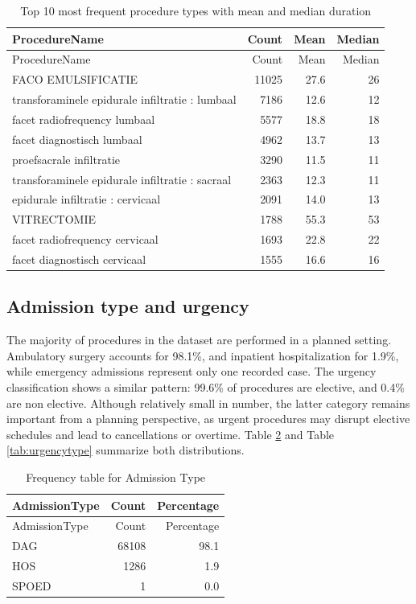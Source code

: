 \documentclass[
]{article}
\begin{document}
\begin{longtable}[]{@{}lrrr@{}}
\caption{Top 10 most frequent procedure types with mean and median
duration \label{tab:top10dur}}\tabularnewline
\toprule\noalign{}
ProcedureName & Count & Mean & Median \\
\midrule\noalign{}
\endfirsthead
\toprule\noalign{}
ProcedureName & Count & Mean & Median \\
\midrule\noalign{}
\endhead
\bottomrule\noalign{}
\endlastfoot
FACO EMULSIFICATIE & 11025 & 27.6 & 26 \\
transforaminele epidurale infiltratie : lumbaal & 7186 & 12.6 & 12 \\
facet radiofrequency lumbaal & 5577 & 18.8 & 18 \\
facet diagnostisch lumbaal & 4962 & 13.7 & 13 \\
proefsacrale infiltratie & 3290 & 11.5 & 11 \\
transforaminele epidurale infiltratie : sacraal & 2363 & 12.3 & 11 \\
epidurale infiltratie : cervicaal & 2091 & 14.0 & 13 \\
VITRECTOMIE & 1788 & 55.3 & 53 \\
facet radiofrequency cervicaal & 1693 & 22.8 & 22 \\
facet diagnostisch cervicaal & 1555 & 16.6 & 16 \\
\end{longtable}

\subsection{Admission type and
urgency}\label{admission-type-and-urgency}

The majority of procedures in the dataset are performed in a planned
setting. Ambulatory surgery accounts for 98.1\%, and inpatient
hospitalization for 1.9\%, while emergency admissions represent only one
recorded case. The urgency classification shows a similar pattern:
99.6\% of procedures are elective, and 0.4\% are non elective. Although
relatively small in number, the latter category remains important from a
planning perspective, as urgent procedures may disrupt elective
schedules and lead to cancellations or overtime. Table
\ref{tab:admissiontype} and Table \ref{tab:urgencytype} summarize both
distributions.

\begin{longtable}[]{@{}lrr@{}}
\caption{Frequency table for Admission Type
\label{tab:admissiontype}}\tabularnewline
\toprule\noalign{}
AdmissionType & Count & Percentage \\
\midrule\noalign{}
\endfirsthead
\toprule\noalign{}
AdmissionType & Count & Percentage \\
\midrule\noalign{}
\endhead
\bottomrule\noalign{}
\endlastfoot
DAG & 68108 & 98.1 \\
HOS & 1286 & 1.9 \\
SPOED & 1 & 0.0 \\
\end{longtable}
\end{document}
